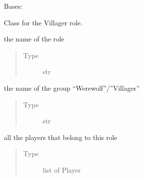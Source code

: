 \documentclass[letterpaper,10pt,english]{sphinxmanual}
\begin{document}
\begin{fulllineitems}
\begin{fulllineitems}
\begin{quote}
\begin{description}
\end{description}\end{quote}

\end{fulllineitems}


\end{fulllineitems}



\begin{fulllineitems}
Bases: 

Class for the Villager role.


\begin{fulllineitems}
the name of the role
\begin{quote}\begin{description}
\item[{Type}] \leavevmode
str

\end{description}\end{quote}

\end{fulllineitems}



\begin{fulllineitems}
the name of the group “Werewolf”/”Villager”
\begin{quote}\begin{description}
\item[{Type}] \leavevmode
str

\end{description}\end{quote}

\end{fulllineitems}



\begin{fulllineitems}
all the players that belong to this role
\begin{quote}\begin{description}
\item[{Type}] \leavevmode
list of Player

\end{description}\end{quote}


\end{fulllineitems}
\end{fulllineitems}
\end{document}
